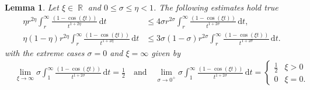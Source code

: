 \documentclass[12pt, reqno]{amsart}%
\theoremstyle{plain}  %
\newtheorem{lemma}[theorem]{Lemma}
\theoremstyle{definition}  %
\theoremstyle{remark}
\numberwithin{equation}{section}
\DeclareMathOperator{\R}{\mathbb{R}}
\renewcommand{\d}{\,\mathrm{d}}
\begin{document}
\begin{lemma}\label{lem:tail-short-cos}
Let  $\xi\in\R$ and $0\leq \sigma\leq \eta<1$. The following estimates hold true
\begin{align*}
\eta  r^{2\eta}\int_r^\infty \frac{(1-\cos (\xi t))}{t^{1+2\eta}}\d t
&\leq 4\sigma  r^{2\sigma}\int_r^\infty \frac{(1-\cos (\xi t))}{t^{1+2\sigma}}\d t,\\
\eta(1-\eta) r^{2\eta} \int_r^\infty \frac{(1-\cos (\xi t))}{t^{1+2\eta}}\d t
&\leq 3\sigma(1-\sigma)  r^{2\sigma}\int_r^\infty \frac{(1-\cos (\xi t))}{t^{1+2\sigma}}\d t .
\end{align*}
with the extreme cases $\sigma=0$ and $\xi=\infty$ given by
\begin{align*}
&\lim_{\xi\to \infty}\sigma  \int_1^\infty \frac{(1-\cos (\xi t))}{t^{1+2\sigma}}\d t =
\frac{1}{2} \quad\text{and}\quad
\lim_{\sigma\to 0^+}\sigma  \int_1^\infty \frac{(1-\cos (\xi t))}{t^{1+2\sigma}}\d t =\begin{cases}
\frac{1}{2}&\xi>0\\
0&\xi=0.
\end{cases}
\end{align*}
\end{lemma}
\end{document}
